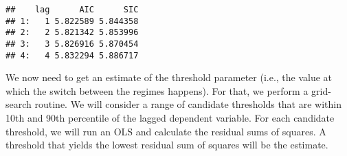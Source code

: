 \documentclass[
  oneside]{book}
\newenvironment{Shaded}{\begin{snugshade}}{\end{snugshade}}
\newcommand{\AttributeTok}[1]{\textcolor[rgb]{0.77,0.63,0.00}{#1}}
\newcommand{\ConstantTok}[1]{\textcolor[rgb]{0.00,0.00,0.00}{#1}}
\newcommand{\ControlFlowTok}[1]{\textcolor[rgb]{0.13,0.29,0.53}{\textbf{#1}}}
\newcommand{\DecValTok}[1]{\textcolor[rgb]{0.00,0.00,0.81}{#1}}
\newcommand{\FunctionTok}[1]{\textcolor[rgb]{0.00,0.00,0.00}{#1}}
\newcommand{\NormalTok}[1]{#1}
\newcommand{\OtherTok}[1]{\textcolor[rgb]{0.56,0.35,0.01}{#1}}
\newcommand{\SpecialCharTok}[1]{\textcolor[rgb]{0.00,0.00,0.00}{#1}}
\newcommand{\StringTok}[1]{\textcolor[rgb]{0.31,0.60,0.02}{#1}}
\begin{document}
\begin{verbatim}
##    lag      AIC      SIC
## 1:   1 5.822589 5.844358
## 2:   2 5.821342 5.853996
## 3:   3 5.826916 5.870454
## 4:   4 5.832294 5.886717
\end{verbatim}

We now need to get an estimate of the threshold parameter (i.e., the value at which the switch between the regimes happens). For that, we perform a grid-search routine. We will consider a range of candidate thresholds that are within 10th and 90th percentile of the lagged dependent variable. For each candidate threshold, we will run an OLS and calculate the residual sums of squares. A threshold that yields the lowest residual sum of squares will be the estimate.

\begin{Shaded}
\end{Shaded}
\end{document}
